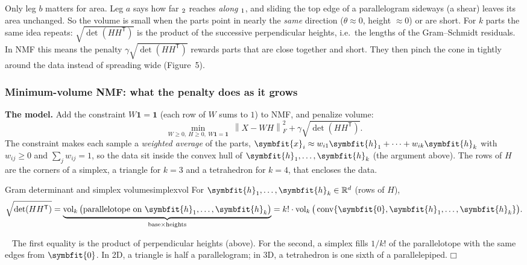 \documentclass[11pt]{article}
\newcommand{\bm}[1]{\symbfit{#1}}
\newenvironment{proofsketch}{\par\noindent{\itshape Proof.}\ }{\hfill$\mdlgwhtsquare$\par}
\newcommand{\R}{\mathbb{R}}
\newcommand{\vx}{\bm{x}}
\let\vv\relax\newcommand{\vv}{\bm{v}}
\newcommand{\vh}{\bm{h}}
\newcommand{\one}{\symbf{1}}
\newcommand{\T}{^{\mathsf T}}
\newcommand{\Fro}[1]{\left\lVert #1\right\rVert_F}
\begin{document}
\begin{intuition}
Only leg $b$ matters for area. Leg $a$ says how far $\vv_2$ reaches \emph{along} $\vv_1$, and sliding the
top edge of a parallelogram sideways (a shear) leaves its area unchanged. So the volume is small
when the parts point in nearly the \emph{same} direction ($\theta\approx0$, height $\approx0$) or are short.
For $k$ parts the same idea repeats: $\sqrt{\det(HH\T)}$ is the product of the successive perpendicular
heights, i.e.\ the lengths of the Gram--Schmidt residuals. In NMF this means the penalty
$\gamma\sqrt{\det(HH\T)}$ rewards parts that are close together and short. They then pinch the cone in
tightly around the data instead of spreading wide (Figure~5).
\end{intuition}

\subsubsection*{Minimum-volume NMF: what the penalty does as it grows}

\textbf{The model.} Add the constraint $W\one=\one$ (each row of $W$ sums to $1$) to NMF, and penalize volume:
\[
\min_{W\ge0,\ H\ge0,\ W\one=\one}\ \Fro{X-WH}^2+\gamma\sqrt{\det(HH\T)} .
\]
The constraint makes each sample a \emph{weighted average} of the parts,
$\vx_i\approx w_{i1}\vh_1+\cdots+w_{ik}\vh_k$ with $w_{ij}\ge0$ and $\sum_jw_{ij}=1$, so the data sit inside the convex hull of
$\vh_1,\dots,\vh_k$ (the argument above). The rows of $H$ are the corners of a simplex, a triangle for $k=3$ and a
tetrahedron for $k=4$, that encloses the data.

\begin{proposition}{Gram determinant and simplex volume}{simplexvol}
For $\vh_1,\dots,\vh_k\in\R^d$ (rows of $H$),
\[
\sqrt{\det(HH\T)}=\underbrace{\operatorname{vol}_k\big(\text{parallelotope on }\vh_1,\dots,\vh_k\big)}_{\text{base}\times\text{heights}}
=k!\cdot\operatorname{vol}_k\big(\operatorname{conv}\{\bm0,\vh_1,\dots,\vh_k\}\big).
\]
\end{proposition}
\begin{proofsketch}
The first equality is the product of perpendicular heights (above). For the second, a simplex fills
$1/k!$ of the parallelotope with the same edges from $\bm0$. In 2D, a triangle is half a parallelogram;
in 3D, a tetrahedron is one sixth of a parallelepiped.
\end{proofsketch}
\end{document}
